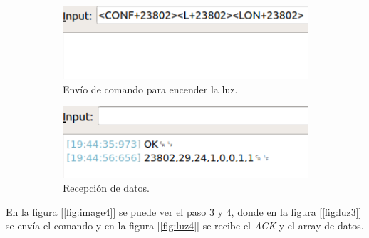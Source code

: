 \begin{figure}[h]

\begin{subfigure}{0.5\textwidth}
\includegraphics[width=1\textwidth]{./Figures/luz1.png}
\caption{Envío de comando para encender la luz.}
\label{fig:luz1}
\end{subfigure}
\begin{subfigure}{0.5\textwidth}
\includegraphics[width=1\textwidth]{./Figures/luz2.png}
\caption{Recepción de datos.}
\label{fig:luz2}
\end{subfigure}

\caption{}
\label{fig:image3}
\end{figure}

En la figura [\ref{fig:image4}] se puede ver el paso 3 y 4, donde en la figura [\ref{fig:luz3}] se envía el comando y en la figura [\ref{fig:luz4}] se recibe el {\textit{ACK}} y el array de datos.

